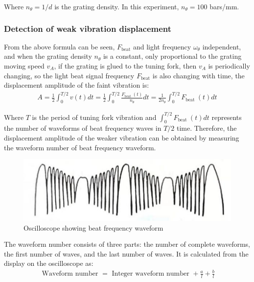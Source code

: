 \documentclass[UTF8]{article}
\begin{document}
   Where $n_{\theta}=1/d$ is the grating density. In this experiment, $n_{\theta}=100$ bars/mm.
   
   \subsubsection{Detection of weak vibration displacement}
   From the above formula can be seen, $F_ {\text{beat}}$ and light frequency $\omega _{\theta } $ independent, and when the grating density $n_{\theta}$ is a constant, only proportional to the grating moving speed $v_A$, if the grating is glued to the tuning fork, then $v_A$ is periodically changing, so the light beat signal frequency $F_ {\text{beat}}$ is also changing with time, the displacement amplitude of the faint vibration is:
   \begin{eqnarray}
   A=\frac{1}{2} \int_{0}^{T / 2} v(t) d t=\frac{1}{2} \int_{0}^{T / 2} \frac{F_{\text {beat }}(t)}{n_{\theta}} d t=\frac{1}{2 n_{\theta}} \int_{0}^{T / 2} F_{\text {beat }}(t) d t
   \end{eqnarray}
   
   Where $T$ is the period of tuning fork vibration and $ \int_{0}^{T / 2} F_{\text {beat }}(t) d t$ represents the number of waveforms of beat frequency waves in $T/2$ time. Therefore, the displacement amplitude of the weaker vibration can be obtained by measuring the waveform number of beat frequency waveform.
   	\begin{figure}[H]
   	    	\centering
   	    	\includegraphics[clip,scale=1,trim={0 0 0 0}]{fig/fig6.png}
   	        \caption{Oscilloscope showing beat frequency waveform}
   	        \label{figure.6}
       \end{figure} 
       
   The waveform number consists of three parts: the number of complete waveforms, the first number of waves, and the last number of waves. It is calculated from the display on the oscilloscope as:
   \begin{eqnarray}
   \text { Waveform number }=\text { Integer waveform number }+\frac{a}{l}+\frac{b}{l}
   \end{eqnarray}
   
\end{document}
